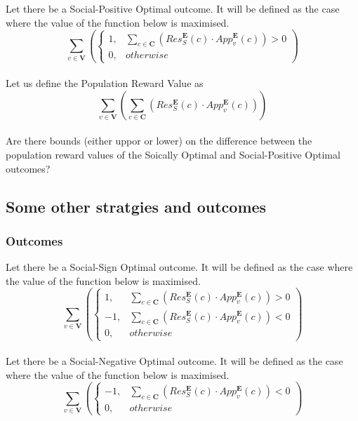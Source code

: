 \documentclass{article}
\begin{document}
Let there be a Social-Positive Optimal outcome. It will be defined as the case where the value of the function below is maximised.
\begin{equation}
\sum^{}_{v \in \pmb{V}}{\left(
\begin{cases}
1, & \sum^{}_{c \in \pmb{C}}{(Res^{\pmb{E}}_{S}(c) \cdot App^{\pmb{E}}_{v}(c))} > 0\\
0, & {otherwise}
\end{cases}
\right)}
\end{equation}\\

Let us define the Population Reward Value as
\begin{equation}
\sum^{}_{v \in \pmb{V}}{\left(
\sum^{}_{c \in \pmb{C}}{\left(
Res^{\pmb{E}}_{S}(c) \cdot App^{\pmb{E}}_{v}(c)
\right)}
\right)}
\end{equation}\\

Are there bounds (either uppor or lower) on the difference between the population reward values of the Soically Optimal and Social-Positive Optimal outcomes?


\subsection{Some other stratgies and outcomes}

\subsubsection{Outcomes}

Let there be a Social-Sign Optimal outcome. It will be defined as the case where the value of the function below is maximised.
\begin{equation}
\sum^{}_{v \in \pmb{V}}{\left(
\begin{cases}
1, & \sum^{}_{c \in \pmb{C}}{(Res^{\pmb{E}}_{S}(c) \cdot App^{\pmb{E}}_{v}(c))} > 0\\
-1, & \sum^{}_{c \in \pmb{C}}{(Res^{\pmb{E}}_{S}(c) \cdot App^{\pmb{E}}_{v}(c))} < 0\\
0, & {otherwise}
\end{cases}
\right)}
\end{equation}\\

Let there be a Social-Negative Optimal outcome. It will be defined as the case where the value of the function below is maximised.
\begin{equation}
\sum^{}_{v \in \pmb{V}}{\left(
\begin{cases}
-1, & \sum^{}_{c \in \pmb{C}}{(Res^{\pmb{E}}_{S}(c) \cdot App^{\pmb{E}}_{v}(c))} < 0\\
0, & {otherwise}
\end{cases}
\right)}
\end{equation}\\
\end{document}
